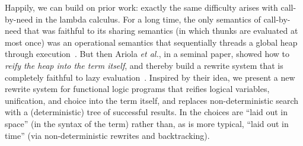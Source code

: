 \documentclass[acmsmall]{acmart}
\newcommand{\etal}{\emph{et al.}\xspace}
\begin{document}
Happily, we can build on prior work: exactly the same difficulty arises with call-by-need in the lambda calculus.
For a long time, the only semantics of
call-by-need that was faithful to its sharing semantics (in which thunks are evaluated at most once)
was an operational semantics that sequentially threads a global heap through execution~\cite{launchbury:natural}.
But then Ariola {\etal}, in a seminal paper, showed how to \emph{reify the heap into the term itself},
and thereby build a rewrite system that is completely faithful to lazy evaluation~\cite{ariola:call-by-need}.
Inspired by their idea, we present a new rewrite system for functional logic programs that reifies
logical variables, unification, and choice into the term itself,
and replaces non-deterministic search with a (deterministic) tree of successful results.
In \versecalc{} the choices are ``laid out in space'' (in the syntax of the term)
rather than, as is more typical, ``laid out in time'' (via non-deterministic rewrites and backtracking).
\end{document}
